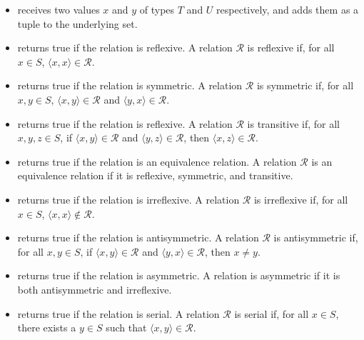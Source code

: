 \begin{itemize}
    \item {} receives two values $x$ and $y$ of types $T$ and $U$ respectively, and adds them as a tuple to the underlying set.
    
    \item {} returns true if the relation is reflexive. A relation $\mathcal{R}$ is reflexive if, for all $x \in S$, $\langle{x, x}\rangle \in \mathcal{R}$.
    
    \item {} returns true if the relation is symmetric. A relation $\mathcal{R}$ is symmetric if, for all $x, y \in S$, $\langle{x, y}\rangle \in \mathcal{R}$ and $\langle{y, x}\rangle \in \mathcal{R}$.
    
    \item {} returns true if the relation is reflexive. A relation $\mathcal{R}$ is transitive if, for all $x, y, z \in S$, if $\langle{x, y}\rangle \in \mathcal{R}$ and $\langle{y, z}\rangle \in \mathcal{R}$, then $\langle{x, z}\rangle \in \mathcal{R}$.
    
    \item {} returns true if the relation is an equivalence relation. A relation $\mathcal{R}$ is an equivalence relation if it is reflexive, symmetric, and transitive.

    \item {} returns true if the relation is irreflexive. A relation $\mathcal{R}$ is irreflexive if, for all $x \in S$, $\langle{x, x}\rangle \not\in \mathcal{R}$.
    
    \item {} returns true if the relation is antisymmetric. A relation $\mathcal{R}$ is antisymmetric if, for all $x, y \in S$, if $\langle{x, y}\rangle \in \mathcal{R}$ and $\langle{y, x}\rangle \in \mathcal{R}$, then $x \neq y$.
    
    \item {} returns true if the relation is asymmetric. A relation is asymmetric if it is both antisymmetric and irreflexive.

    \item {} returns true if the relation is serial. A relation $\mathcal{R}$ is serial if, for all $x \in S$, there exists a $y \in S$ such that $\langle{x, y}\rangle \in \mathcal{R}$.


\end{itemize}
